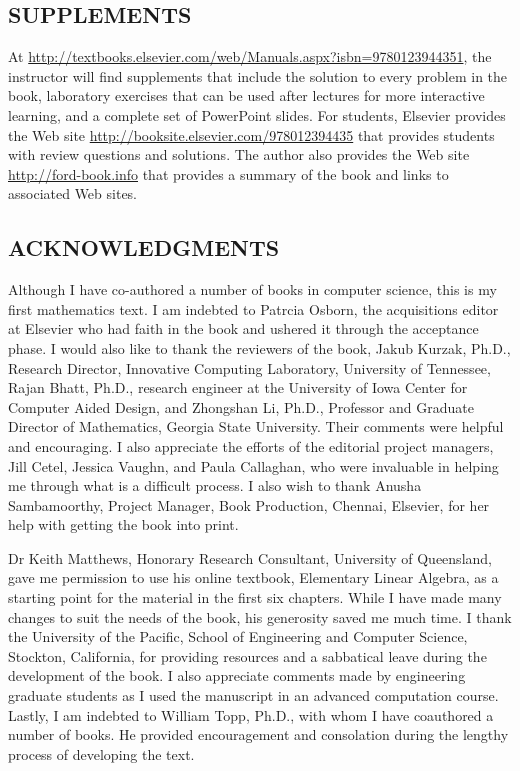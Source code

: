 \documentclass[../main.tex]{subfiles}
\begin{document}
\subsection*{SUPPLEMENTS}
At \url {http://textbooks.elsevier.com/web/Manuals.aspx?isbn=9780123944351}, the instructor will find supplements that include
the solution to every problem in the book, laboratory exercises that can be used after lectures for more interactive learning, and a complete set of PowerPoint slides. For students, Elsevier provides the Web site \url{http://booksite.elsevier.com/978012394435} that provides students with review questions and solutions. The author also provides the Web site \url{http://ford-book.info} that provides a summary of the book and links to associated Web sites.

\subsection*{ACKNOWLEDGMENTS}
Although I have co-authored a number of books in computer science, this is my first mathematics text. I am indebted to Patrcia Osborn, the acquisitions editor at Elsevier who had faith in the book and ushered it through the acceptance phase. I would also like to thank the reviewers of the book, Jakub Kurzak, Ph.D., Research Director, Innovative Computing Laboratory, University of Tennessee, Rajan Bhatt, Ph.D., research engineer at the University of Iowa Center for Computer Aided Design, and Zhongshan Li, Ph.D., Professor and Graduate Director of Mathematics, Georgia State University. Their comments were helpful and encouraging. I also appreciate the efforts of the editorial project managers, Jill Cetel, Jessica Vaughn, and Paula Callaghan, who were invaluable in helping me through what is a difficult process. I also wish to thank Anusha Sambamoorthy, Project Manager, Book Production, Chennai, Elsevier, for her help with getting the book into print. 

Dr Keith Matthews, Honorary Research Consultant, University of Queensland, gave me permission to use his online textbook, Elementary Linear Algebra, as a starting point for the material in the first six chapters. While I have made many changes to suit the needs of the book, his generosity saved me much time.
I thank the University of the Pacific, School of Engineering and Computer Science, Stockton, California, for providing resources and a sabbatical leave during the development of the book. I also appreciate comments made by engineering graduate students as I used the manuscript in an advanced computation course. Lastly, I am indebted to William Topp, Ph.D., with whom I have coauthored a number of books. He provided encouragement and consolation during the lengthy process of developing the text.
\end{document}
